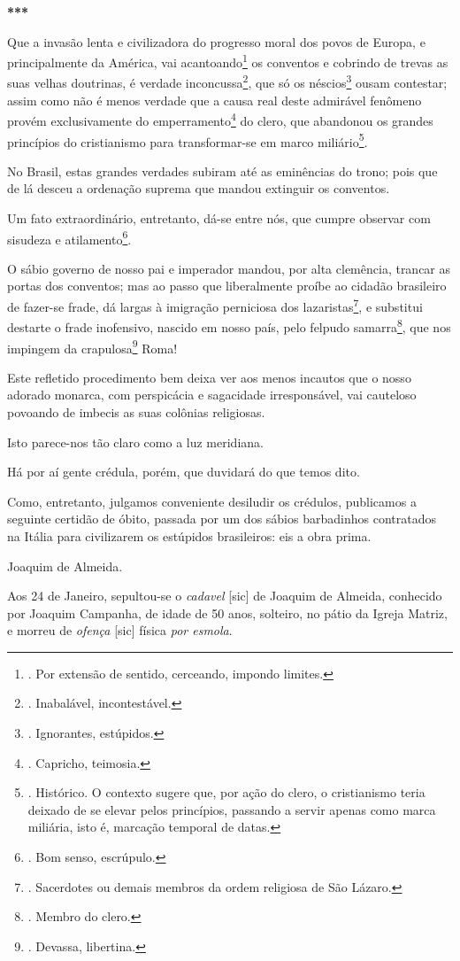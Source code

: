 \textbf{***}

Que a invasão lenta e civilizadora do progresso moral dos povos de
Europa, e principalmente da América, vai acantoando\footnote{. Por
  extensão de sentido, cerceando, impondo limites.} os conventos e
cobrindo de trevas as suas velhas doutrinas, é verdade
inconcussa\footnote{. Inabalável, incontestável.}, que só os
néscios\footnote{. Ignorantes, estúpidos.} ousam contestar; assim como
não é menos verdade que a causa real deste admirável fenômeno provém
exclusivamente do emperramento\footnote{. Capricho, teimosia.} do clero,
que abandonou os grandes princípios do cristianismo para transformar-se
em marco miliário\footnote{. Histórico. O contexto sugere que, por ação
  do clero, o cristianismo teria deixado de se elevar pelos princípios,
  passando a servir apenas como marca miliária, isto é, marcação
  temporal de datas.}.

No Brasil, estas grandes verdades subiram até as eminências do trono;
pois que de lá desceu a ordenação suprema que mandou extinguir os
conventos.

Um fato extraordinário, entretanto, dá-se entre nós, que cumpre observar
com sisudeza e atilamento\footnote{. Bom senso, escrúpulo.}.

O sábio governo de nosso pai e imperador mandou, por alta clemência,
trancar as portas dos conventos; mas ao passo que liberalmente proíbe ao
cidadão brasileiro de fazer-se frade, dá largas à imigração perniciosa
dos lazaristas\footnote{. Sacerdotes ou demais membros da ordem
  religiosa de São Lázaro.}, e substitui destarte o frade inofensivo,
nascido em nosso país, pelo felpudo samarra\footnote{. Membro do clero.},
que nos impingem da crapulosa\footnote{. Devassa, libertina.} Roma!

Este refletido procedimento bem deixa ver aos menos incautos que o nosso
adorado monarca, com perspicácia e sagacidade irresponsável, vai
cauteloso povoando de imbecis as suas colônias religiosas.

Isto parece-nos tão claro como a luz meridiana.

Há por aí gente crédula, porém, que duvidará do que temos dito.

Como, entretanto, julgamos conveniente desiludir os crédulos, publicamos
a seguinte certidão de óbito, passada por um dos sábios barbadinhos
contratados na Itália para civilizarem os estúpidos brasileiros: eis a
obra prima.

Joaquim de Almeida.

Aos 24 de Janeiro, sepultou-se o \emph{cadavel} {[}sic{]} de Joaquim de
Almeida, conhecido por Joaquim Campanha, de idade de 50 anos, solteiro,
no pátio da Igreja Matriz, e morreu de \emph{ofença} {[}sic{]} física
\emph{por esmola}.

